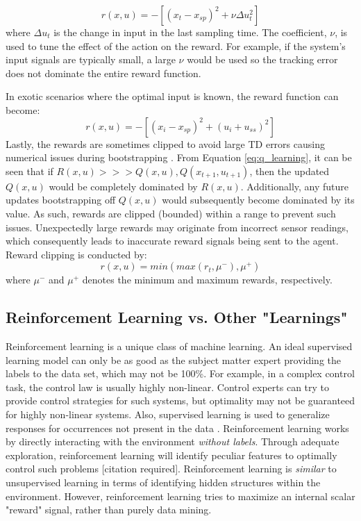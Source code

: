 \begin{equation}
    r(x, u) = -[(x_t - x_{sp})^2 + \nu \Delta u_t^2]
\end{equation}
where $\Delta u_t$ is the change in input in the last sampling time. The coefficient, $\nu$, is used to tune the effect of the action on the reward.  For example, if the system's input signals are typically small, a large $\nu$ would be used so the tracking error does not dominate the entire reward function.

In exotic scenarios where the optimal input is known, the reward function can become:
\begin{equation}
    r(x, u) = -[(x_i - x_{sp})^2 + (u_i + u_{ss})^2]
\end{equation}
Lastly, the rewards are sometimes clipped to avoid large TD errors causing numerical issues during bootstrapping \cite{reward_clip}.  From Equation \ref{eq:q_learning}, it can be seen that if $R(x, u) >>> Q(x, u), Q(x_{t+1}, u_{t+1})$, then the updated $Q(x, u)$ would be completely dominated by $R(x, u)$. Additionally, any future updates bootstrapping off $Q(x, u)$ would subsequently become dominated by its value. As such, rewards are clipped (bounded) within a range to prevent such issues. Unexpectedly large rewards may originate from incorrect sensor readings, which consequently leads to inaccurate reward signals being sent to the agent.  Reward clipping is conducted by:
\begin{equation}
    r(x, u) = min(max(r_t,\mu^- ), \mu^+)
    \label{reward_clipping}
\end{equation}
where $\mu^-$ and $\mu^+$ denotes the minimum and maximum rewards, respectively. 




\subsection{Reinforcement Learning vs. Other "Learnings"}

Reinforcement learning is a unique class of machine learning.  An ideal supervised learning model can only be as good as the subject matter expert providing the labels to the data set, which may not be 100\%.  For example, in a complex control task, the control law is usually highly non-linear. Control experts can try to provide control strategies for such systems, but optimality may not be guaranteed for highly non-linear systems. Also, supervised learning is used to generalize responses for occurrences not present in the data \cite{sutton}.  Reinforcement learning works by directly interacting with the environment \textit{without labels}. Through adequate exploration, reinforcement learning will identify peculiar features to optimally control such problems [citation required].  Reinforcement learning is \textit{similar} to unsupervised learning in terms of identifying hidden structures within the environment.  However, reinforcement learning tries to maximize an internal scalar "reward" signal, rather than purely data mining.

